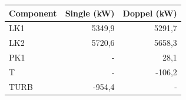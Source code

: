 \begin{longtable}{lrr}
\hline
Component & Single (kW) & Doppel (kW) \\
\hline
LK1 & 5349,9 & 5291,7 \\
LK2 & 5720,6 & 5658,3 \\
PK1 & - & 28,1 \\
T & - & -106,2 \\
TURB & -954,4 & - \\
\hline
\end{longtable}